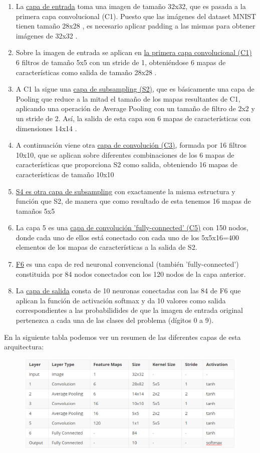 \documentclass[a4paper,11pt]{article}
\begin{document}
\begin{enumerate}
	\item La \underline{capa de entrada} toma una imagen de tamaño  32x32, que es pasada a la primera capa convolucional (C1). Puesto que las imágenes del dataset MNIST tienen tamaño  28x28 , es necesario aplicar padding a las mismas para obtener imágenes de  32x32 . 
	\item Sobre la imagen de entrada se aplican en \underline{la primera capa convolucional (C1)} 6 filtros de tamaño  5x5  con un stride de 1, obteniéndose 6 mapas de características como salida de tamaño  28x28 . 
	\item A C1 la sigue una \underline{capa de subsampling (S2)}, que es básicamente una capa de Pooling que reduce a la mitad el tamaño de los mapas resultantes de C1, aplicando una operación de Average Pooling con un tamaño de filtro de 2x2 y un stride de 2. Así, la salida de esta capa son 6 mapas de características con dimensiones  14x14 .
	\item A continuación viene otra \underline{capa de convolución (C3)}, formada por 16 filtros  10x10,  que se aplican sobre diferentes combinaciones de los 6 mapas de características que proporciona S2 como salida, obteniendo 16 mapas de características de tamaño  10x10 
	\item \underline{S4 es otra capa de subsampling} con exactamente la misma estructura y función que S2, de manera que como resultado de esta tenemos 16 mapas de tamaños  5x5 
	\item La capa 5 es una \underline{capa de convolución 'fully-connected' (C5)} con 150 nodos, donde cada uno de ellos está conectado con cada uno de los  5x5x16=400   elementos de los mapas de características a la salida de S2.
	\item \underline{F6} es una capa de red neuronal convencional (también 'fully-connected') constituida por 84 nodos conectados con los 120 nodos de la capa anterior. 
	\item La \underline{capa de salida} consta de 10 neuronas conectadas con las 84 de F6 que aplican la función de activación softmax y da 10 valores como salida correspondientes a las probabilidides de que la imagen de entrada original pertenezca a cada una de las clases del problema (dígitos 0 a 9).
\end{enumerate}

En la siguiente tabla podemos ver un resumen de las diferentes capas de esta arquitectura:


\begin{figure}[H]
	\centering
	\includegraphics[width=1\linewidth]{img/lenet2}
	\caption{}
	\label{fig:lenet2}
\end{figure}
\end{document}
